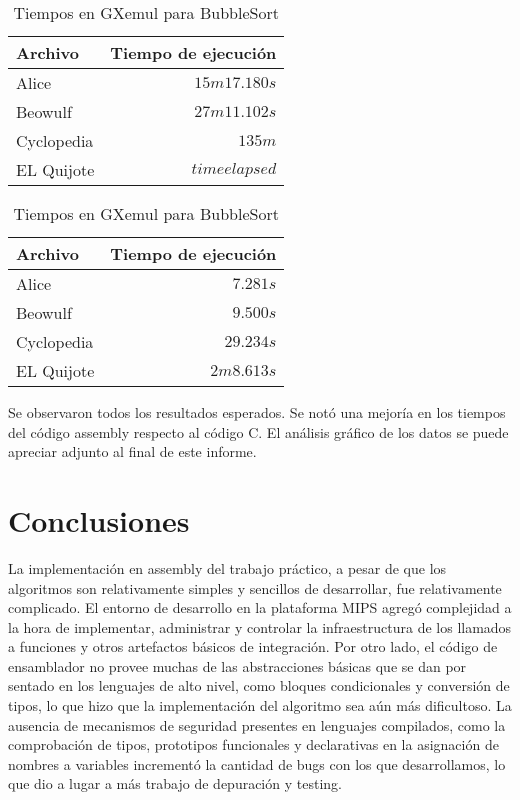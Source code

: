\documentclass[a4paper,11pt]{article}
\begin{document}
\FloatBarrier

\begin{table}[h!t]
\centering
\begin{tabular}{ | l | r | }
  \hline
  Archivo          & Tiempo de ejecución \\ \hline
  Alice				 & \(15m 17.180s\) \\
  Beowulf     & \(27m 11.102s\) \\
  Cyclopedia     & \(135m\) \\
  EL Quijote      & \(time elapsed\) \\
  \hline
\end{tabular}
\caption{Tiempos en GXemul para BubbleSort}
\label{tab:resultados}
\end{table}

\FloatBarrier

\begin{table}[h!t]
\centering
\begin{tabular}{ | l | r | }
  \hline
  Archivo          & Tiempo de ejecución \\ \hline
  Alice				 & \(7.281s\) \\
  Beowulf     & \(9.500s\) \\
  Cyclopedia     & \(29.234s\) \\
  EL Quijote      & \(2m 8.613s\) \\
  \hline
\end{tabular}
\caption{Tiempos en GXemul para BubbleSort}
\label{tab:resultados}
\end{table}

\FloatBarrier

Se observaron todos los resultados esperados. Se notó una mejoría en los tiempos del código assembly respecto al código C. El análisis gráfico de los datos se puede apreciar adjunto al final de este informe.

\section{Conclusiones}

La implementación en assembly del trabajo práctico, a pesar de que los algoritmos son relativamente simples y sencillos de desarrollar, fue
relativamente complicado. El entorno de desarrollo en la plataforma MIPS agregó complejidad a la hora de implementar, administrar y controlar la infraestructura de los llamados a
funciones y otros artefactos básicos de integración. Por otro lado, el código
de ensamblador no provee muchas de las abstracciones básicas que se dan por
sentado en los lenguajes de alto nivel, como bloques condicionales y conversión
de tipos, lo que hizo que la implementación del algoritmo sea aún más
dificultoso. La ausencia de mecanismos de seguridad presentes en
lenguajes compilados, como la comprobación de tipos, prototipos funcionales y
declarativas en la asignación de nombres a variables incrementó la cantidad
de bugs con los que desarrollamos, lo que dio a lugar a más trabajo de depuración y testing.
\end{document}
